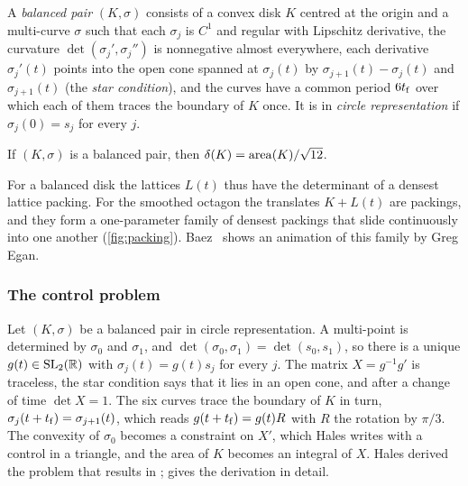 \begin{definition}\label{def:balanced}
A \emph{balanced pair} $(K,\sigma)$ consists of a convex disk $K$ centred at the origin and a
multi-curve $\sigma$ such that each $\sigma_j$ is $C^1$ and regular with Lipschitz derivative, the
curvature $\det(\sigma_j',\sigma_j'')$ is nonnegative almost everywhere, each derivative
$\sigma_j'(t)$ points into the open cone spanned at $\sigma_j(t)$ by $\sigma_{j+1}(t)-\sigma_j(t)$
and $\sigma_{j+1}(t)$ (the \emph{star condition}), and the curves have a common period $6t_{\mathrm{f}}$ over
which each of them traces the boundary of $K$ once. It is in \emph{circle representation} if
$\sigma_j(0)=s_j$ for every $j$.
\end{definition}

\begin{proposition}\label{prop:balanced-density}
If $(K,\sigma)$ is a balanced pair, then $\delta(K)=\operatorname{area}(K)/\sqrt{12}$.
\end{proposition}

For a balanced disk the lattices $L(t)$ thus have the determinant of a densest lattice packing. For
the smoothed octagon the translates $K+L(t)$ are packings, and they form a one-parameter family of
densest packings that slide continuously into one another (\cref{fig:packing}). Baez~\cite{Baez2014}
shows an animation of this family by Greg Egan.


\subsubsection{The control problem}\label{sec:set-control}

Let $(K,\sigma)$ be a balanced pair in circle representation. A multi-point is determined by
$\sigma_0$ and $\sigma_1$, and $\det(\sigma_0,\sigma_1)=\det(s_0,s_1)$, so there is a unique
$g(t)\in\mathrm{SL}_2(\mathbb{R})$ with $\sigma_j(t)=g(t)s_j$ for every $j$. The matrix $X=g^{-1}g'$ is traceless, the
star condition says that it lies in an open cone, and after a change of time $\det X=1$. The six
curves trace the boundary of $K$ in turn, $\sigma_j(t+t_{\mathrm{f}})=\sigma_{j+1}(t)$, which reads
$g(t+t_{\mathrm{f}})=g(t)R$ with $R$ the rotation by $\pi/3$. The convexity of $\sigma_0$ becomes a constraint
on $X'$, which Hales writes with a control in a triangle, and the area of $K$ becomes an integral
of $X$. Hales derived the problem that results in \cite{Hales2011,Hales2017};
\cite[Ch.~3--4]{HalesVajjha2024} gives the derivation in detail.

